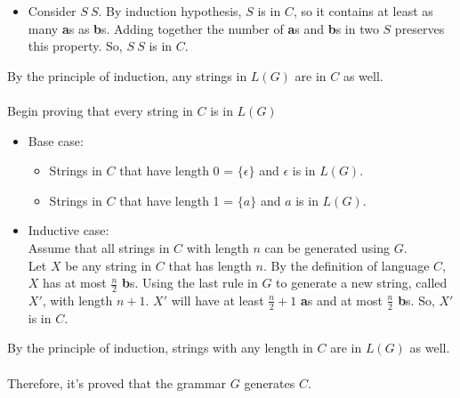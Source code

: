 \documentclass{article}
\begin{document}
\begin{enumerate}
\begin{itemize}
\begin{itemize}
                \item
                Consider $S\ S$. By induction hypothesis, $S$ is in $C$, so it contains at least as many \textbf{a}s as \textbf{b}s. Adding together the number of \textbf{a}s and \textbf{b}s in two $S$ preserves this property. So, $S\ S$ is in $C$.
            \end{itemize}
            
        \end{itemize}
    By the principle of induction, any strings in $L(G)$ are in $C$ as well.\\
    \\
    Begin proving that every string in $C$ is in $L(G)$
    \begin{itemize}
        \item
        Base case:
        \begin{itemize}
            \item
            Strings in $C$ that have length 0 = $\{\epsilon\}$ and $\epsilon$ is in $L(G)$.
            \item
            Strings in $C$ that have length 1 = $\{a\}$ and $a$ is in $L(G)$.
        \end{itemize}
        
        \item
        Inductive case:\\
        Assume that all strings in $C$ with length $n$ can be generated using $G$.\\
        Let $X$ be any string in $C$ that has length $n$. By the definition of language $C$, $X$ has at most $\frac{n}{2}$ \textbf{b}s. Using the last rule in $G$ to generate a new string, called $X'$, with length $n + 1$. $X'$ will have at least $\frac{n}{2} + 1$ \textbf{a}s and at most $\frac{n}{2}$ \textbf{b}s. So, $X'$ is in $C$.
    \end{itemize}
    
    By the principle of induction, strings with any length in $C$ are in $L(G)$ as well.\\
    \\
    Therefore, it's proved that the grammar $G$ generates $C$.
\end{enumerate}
\end{document}
